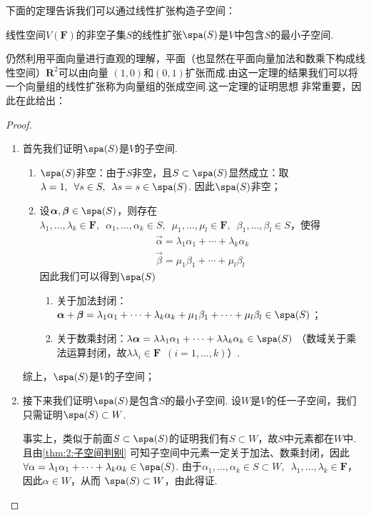 下面的定理告诉我们可以通过线性扩张构造子空间：
\begin{theorem}\label{thm:2:线性扩张构造子空间}
    线性空间$V(\mathbf{F})$的非空子集$S$的线性扩张$\spa(S)$是$V$中包含$S$的最小子空间.
\end{theorem}
仍然利用平面向量进行直观的理解，平面（也显然在平面向量加法和数乘下构成线性空间）$\mathbf{R}^2$可以由向量
$(1,0)$和$(0,1)$扩张而成.由这一定理的结果我们可以将一个向量组的线性扩张称为向量组的张成空间.这一定理的证明思想
非常重要，因此在此给出：

\begin{proof}
    \begin{enumerate}
        \item 首先我们证明$\spa(S)$是$V$的子空间.
        \begin{enumerate}[label=(\arabic*)]
            \item $\spa(S)$非空：由于$S$非空，且$S\subset\spa(S)$显然成立：取$\lambda=1,\enspace\forall s\in S,\enspace
            \lambda s=s\in\spa(S)$. 因此$\spa(S)$非空；
            \item 设$\vec{\alpha},\vec{\beta}\in\spa(S)$，则存在$\lambda_1,\ldots,\lambda_k\in\mathbf{F},\enspace
            \alpha_1,\ldots,\alpha_k\in S,\enspace\mu_1,\ldots,\mu_l\in\mathbf{F},\enspace\beta_1,\ldots,\beta_l\in S$，使得
            \begin{gather*}
                \vec{\alpha}=\lambda_1\alpha_1+\cdots+\lambda_k\alpha_k \\
                \vec{\beta}=\mu_1\beta_1+\cdots+\mu_l\beta_l
            \end{gather*}
            因此我们可以得到$\spa(S)$
            \begin{enumerate}
                \item 关于加法封闭：$\vec{\alpha}+\vec{\beta}=\lambda_1\alpha_1+\cdots+\lambda_k\alpha_k+\mu_1\beta_1+\cdots+\mu_l\beta_l\in\spa(S)$；
                \item 关于数乘封闭：$\lambda\vec{\alpha}=\lambda\lambda_1\alpha_1+\cdots+\lambda\lambda_k\alpha_k\in\spa(S)$
                （数域关于乘法运算封闭，故$\lambda\lambda_i\in\mathbf{F}\enspace(i=1,\ldots,k)$）.
            \end{enumerate}
        \end{enumerate}
        综上，$\spa(S)$是$V$的子空间；
        \item 接下来我们证明$\spa(S)$是包含$S$的最小子空间. 设$W$是$V$的任一子空间，我们只需证明$\spa(S)\subset W$.

        事实上，类似于前面$S\subset\spa(S)$的证明我们有$S\subset W$，故$S$中元素都在$W$中. 且由\autoref{thm:2:子空间判别}
        可知子空间中元素一定关于加法、数乘封闭，因此$\forall {\alpha}=\lambda_1\alpha_1+\cdots+\lambda_k\alpha_k\in\spa(S)$.
        由于$\alpha_1,\ldots,\alpha_k\in S\subset W,\enspace\lambda_1,\ldots,\lambda_k\in\mathbf{F}$，因此$\alpha\in W$，从而
        $\spa(S)\subset W$，由此得证.
    \end{enumerate}
\end{proof}

